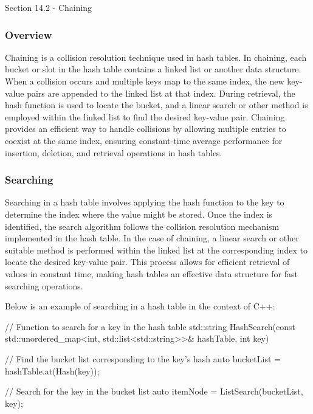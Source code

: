 \begin{notes}{Section 14.2 - Chaining}
    \subsubsection*{Overview}

    Chaining is a collision resolution technique used in hash tables. In chaining, each bucket or slot in the hash table contains a linked list or another data structure. When a collision occurs and multiple keys 
    map to the same index, the new key-value pairs are appended to the linked list at that index. During retrieval, the hash function is used to locate the bucket, and a linear search or other method is employed 
    within the linked list to find the desired key-value pair. Chaining provides an efficient way to handle collisions by allowing multiple entries to coexist at the same index, ensuring constant-time average 
    performance for insertion, deletion, and retrieval operations in hash tables.
    
    \subsubsection*{Searching}
    
    Searching in a hash table involves applying the hash function to the key to determine the index where the value might be stored. Once the index is identified, the search algorithm follows the collision resolution 
    mechanism implemented in the hash table. In the case of chaining, a linear search or other suitable method is performed within the linked list at the corresponding index to locate the desired key-value pair. This 
    process allows for efficient retrieval of values in constant time, making hash tables an effective data structure for fast searching operations.
    
    \begin{highlight}
        Below is an example of searching in a hash table in the context of C++:
    
    \begin{code}[C++]
    // Function to search for a key in the hash table
    std::string HashSearch(const std::unordered_map<int, std::list<std::string>>& 
                            hashTable, int key) {
        // Find the bucket list corresponding to the key's hash
        auto bucketList = hashTable.at(Hash(key));
        
        // Search for the key in the bucket list
        auto itemNode = ListSearch(bucketList, key);
    
}
\end{code}
\end{highlight}
\end{notes}

